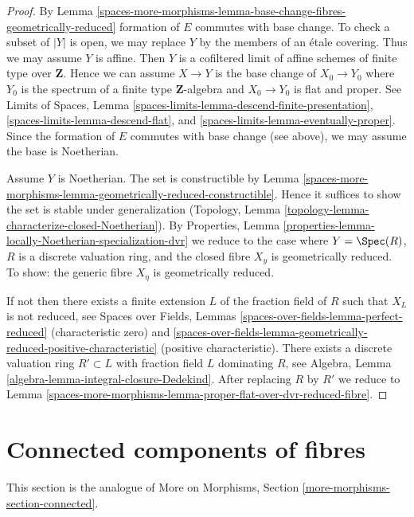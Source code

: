 \begin{proof}
By Lemma \ref{spaces-more-morphisms-lemma-base-change-fibres-geometrically-reduced}
formation of $E$ commutes with base change. To check a subset
of $|Y|$ is open, we may replace $Y$ by the members of an
\'etale covering. Thus we may assume $Y$ is affine.
Then $Y$ is a cofiltered limit of affine
schemes of finite type over $\mathbf{Z}$.
Hence we can assume $X \to Y$ is the
base change of $X_0 \to Y_0$ where $Y_0$ is the spectrum of a finite
type $\mathbf{Z}$-algebra and $X_0 \to Y_0$ is flat and proper.
See Limits of Spaces, Lemma
\ref{spaces-limits-lemma-descend-finite-presentation},
\ref{spaces-limits-lemma-descend-flat}, and
\ref{spaces-limits-lemma-eventually-proper}. Since the formation of
$E$ commutes with base change (see above),
we may assume the base is Noetherian.

\medskip\noindent
Assume $Y$ is Noetherian. The set is constructible by
Lemma \ref{spaces-more-morphisms-lemma-geometrically-reduced-constructible}.
Hence it suffices to show the set is stable under generalization
(Topology, Lemma \ref{topology-lemma-characterize-closed-Noetherian}). By
Properties, Lemma \ref{properties-lemma-locally-Noetherian-specialization-dvr}
we reduce to the case where $Y = \Spec(R)$, $R$ is a discrete
valuation ring, and the closed fibre $X_y$ is geometrically
reduced. To show: the generic fibre $X_\eta$ is geometrically reduced.

\medskip\noindent
If not then there exists a finite extension $L$ of the fraction
field of $R$ such that $X_L$ is not reduced, see
Spaces over Fields, Lemmas
\ref{spaces-over-fields-lemma-perfect-reduced} (characteristic zero) and
\ref{spaces-over-fields-lemma-geometrically-reduced-positive-characteristic}
(positive characteristic). There exists a discrete valuation ring
$R' \subset L$ with fraction field $L$ dominating $R$, see
Algebra, Lemma \ref{algebra-lemma-integral-closure-Dedekind}.
After replacing $R$ by $R'$ we reduce to
Lemma \ref{spaces-more-morphisms-lemma-proper-flat-over-dvr-reduced-fibre}.
\end{proof}

\section{Connected components of fibres}
\label{spaces-more-morphisms-section-connected}
This section is the analogue of
More on Morphisms, Section \ref{more-morphisms-section-connected}.

